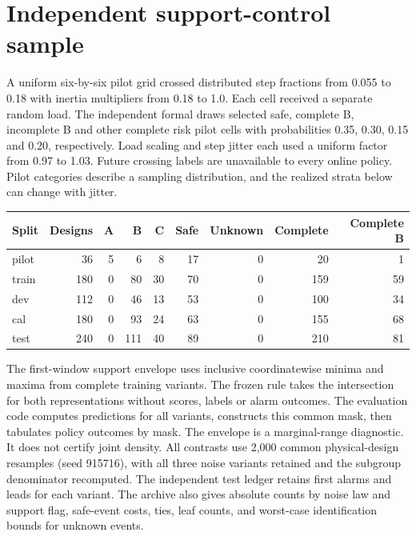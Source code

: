 \documentclass[10pt]{article}
\begin{document}
\section{Independent support-control sample}
A uniform six-by-six pilot grid crossed distributed step fractions from 0.055 to 0.18 with inertia multipliers from 0.18 to 1.0. Each cell received a separate random load. The independent formal draws selected safe, complete B, incomplete B and other complete risk pilot cells with probabilities 0.35, 0.30, 0.15 and 0.20, respectively. Load scaling and step jitter each used a uniform factor from 0.97 to 1.03. Future crossing labels are unavailable to every online policy. Pilot categories describe a sampling distribution, and the realized strata below can change with jitter.
\begin{center}\small\begin{tabular}{lrrrrrrrr}\toprule
Split & Designs & A & B & C & Safe & Unknown & Complete & Complete B\\\midrule
pilot & 36 & 5 & 6 & 8 & 17 & 0 & 20 & 1 \\
train & 180 & 0 & 80 & 30 & 70 & 0 & 159 & 59 \\
dev & 112 & 0 & 46 & 13 & 53 & 0 & 100 & 34 \\
cal & 180 & 0 & 93 & 24 & 63 & 0 & 155 & 68 \\
test & 240 & 0 & 111 & 40 & 89 & 0 & 210 & 81 \\
\bottomrule\end{tabular}\end{center}
The first-window support envelope uses inclusive coordinatewise minima and maxima from complete training variants. The frozen rule takes the intersection for both representations without scores, labels or alarm outcomes. The evaluation code computes predictions for all variants, constructs this common mask, then tabulates policy outcomes by mask. The envelope is a marginal-range diagnostic. It does not certify joint density. All contrasts use 2,000 common physical-design resamples (seed 915716), with all three noise variants retained and the subgroup denominator recomputed. The independent test ledger retains first alarms and leads for each variant. The archive also gives absolute counts by noise law and support flag, safe-event costs, ties, leaf counts, and worst-case identification bounds for unknown events.
\end{document}
